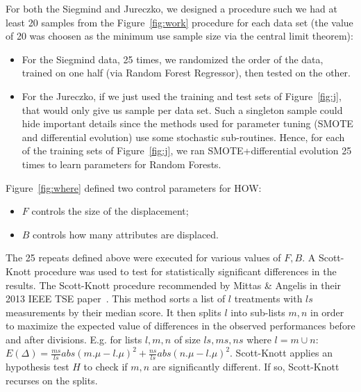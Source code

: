 \documentclass[conference]{IEEEtran}
\newcommand{\bi}{\begin{itemize}}
\newcommand{\ei}{\end{itemize}}
\newcommand{\fig}[1]{Figure~\ref{fig:#1}}
\begin{document}
   For both the Siegmind and Jureczko, we designed a procedure such we had at least
   20 samples from the \fig{work} procedure for  each data set (the value of 20 was choosen as the minimum use sample size via the central limit theorem):
   \bi
   \item
  For the Siegmind data, 
  25 times, 
  we randomized the order of the data, trained on one half (via
  Random Forest Regressor), then tested on the other.
  \item
  For the Jureczko, if we just  used the training and test sets of  \fig{j}, that would only
  give us sample per data set. Such a singleton sample could hide important details since the methods
  used for parameter tuning (SMOTE and differential evolution) use some stochastic sub-routines.
  Hence, for each  of the training sets of \fig{j}, we ran SMOTE+differential evolution 25 times to learn
  parameters for Random Forests.
  \ei
\fig{where} defined two control parameters for HOW:
\bi
\item  $F$   controls the size of the displacement;
\item   $B$   controls how many  attributes are displaced.
\ei
The   25 repeats defined above were executed for various values of $F,B$.
A Scott-Knott procedure was used to test for statistically significant differences in the results.
The Scott-Knott
procedure recommended by Mittas \& Angelis in their 2013
IEEE TSE paper~\cite{mittas13}.  This method
sorts a list of $l$ treatments with $ls$ measurements by their median
score. It then
splits $l$ into sub-lists $m,n$ in order to maximize the expected value of
 differences  in the observed performances
before and after divisions. E.g. for lists $l,m,n$ of size $ls,ms,ns$ where $l=m\cup n$:
 $E(\Delta)=\frac{ms}{ls}abs(m.\mu - l.\mu)^2 + \frac{ns}{ls}abs(n.\mu - l.\mu)^2$.
Scott-Knott  applies an  hypothesis test $H$ to check
if $m,n$ are significantly different. If so, Scott-Knott  recurses on the splits.
 
 

  
  

\end{document}
